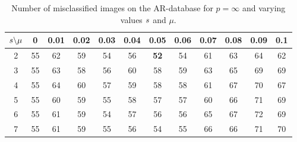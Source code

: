 \documentclass[11pt]{article}
\begin{document}
\begin{table}
\centering
\begin{tabular}{|c|ccccccccccc|}\hline
${s} \backslash \mu$ & 0 & 0.01 & 0.02 & 0.03 & 0.04 & 0.05 & 0.06 & 0.07& 0.08 & 0.09 & 0.1\\ \hline
 2  & 55  &  62 &   59  &  54  &  56  & {\bf 52}  &  54  &  61  &  63  &  64  &  62\\
 3   &55  &  63  &  58  &  56  &  60  &  58  &  59  &  63  &  65  &  69  &  69\\
 4   &55  &  64  &  60  &  57  &  59  &  58  &  58  &  61  &  67  &  70  &  67\\
 5 &  55  &  60  &  59  &  55  &  58  &  57  &  57  &  60  &  66  &  71  &  69\\
 6  & 55  &  61  &  59  &  54  &  57  &  56  &  56  &  65  &  67  &  72  &  69\\
 7 &  55   & 61  &  59 &   55  &  56  &  54  &  55  &  66  &  66  &  71  &  70\\ \hline
\end{tabular}
\caption{Number of misclassified images on the AR-database for $p=\infty$ and varying values ${s}$ and $\mu$.}
\label{tab:li}
\end{table}
\end{document}
